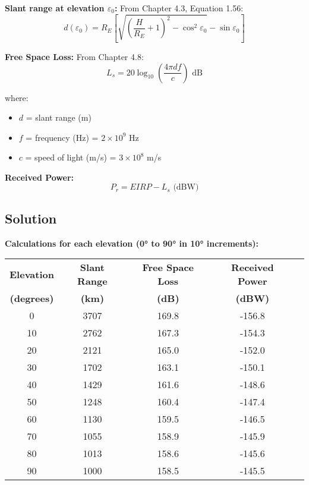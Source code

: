 \documentclass[11pt,letterpaper]{article}
\begin{document}
\textbf{Slant range at elevation $\varepsilon_0$:}
From Chapter 4.3, Equation 1.56:
\begin{equation}
d(\varepsilon_0) = R_E \left[\sqrt{\left(\frac{H}{R_E} + 1\right)^2 - \cos^2 \varepsilon_0} - \sin \varepsilon_0\right]
\end{equation}

\textbf{Free Space Loss:}
From Chapter 4.8:
\begin{equation}
L_s = 20 \log_{10}\left(\frac{4\pi d f}{c}\right) \text{ dB}
\end{equation}

where:
\begin{itemize}
    \item $d$ = slant range (m)
    \item $f$ = frequency (Hz) = $2 \times 10^9$ Hz
    \item $c$ = speed of light (m/s) = $3 \times 10^8$ m/s
\end{itemize}

\textbf{Received Power:}
\begin{equation}
P_r = EIRP - L_s \text{ (dBW)}
\end{equation}

\subsection{Solution}
\textbf{Calculations for each elevation (0° to 90° in 10° increments):}

\begin{center}
\begin{tabular}{@{}ccccc@{}}
\toprule
\textbf{Elevation} & \textbf{Slant Range} & \textbf{Free Space Loss} & \textbf{Received Power} \\
\textbf{(degrees)} & \textbf{(km)} & \textbf{(dB)} & \textbf{(dBW)} \\
\midrule
0  & 3707 & 169.8 & -156.8 \\
10 & 2762 & 167.3 & -154.3 \\
20 & 2121 & 165.0 & -152.0 \\
30 & 1702 & 163.1 & -150.1 \\
40 & 1429 & 161.6 & -148.6 \\
50 & 1248 & 160.4 & -147.4 \\
60 & 1130 & 159.5 & -146.5 \\
70 & 1055 & 158.9 & -145.9 \\
80 & 1013 & 158.6 & -145.6 \\
90 & 1000 & 158.5 & -145.5 \\
\bottomrule
\end{tabular}
\end{center}
\end{document}
